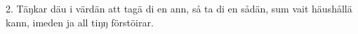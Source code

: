 2.  Täŋkar däu i värdän att tagä di en ann,
    så ta di en sådän, sum vait häushållä kann,
    imeden ja all tiŋŋ förstöirar.
